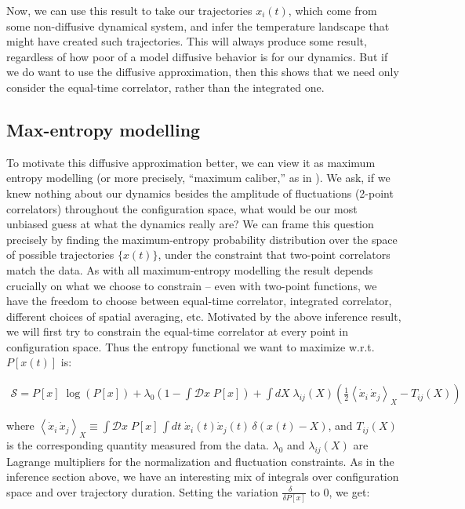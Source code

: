 \documentclass[reprint,prx]{revtex4-1}
\newcommand{\fd}[2]{\frac{\delta #1}{\delta #2}} %
\renewcommand{\=}[1]{\stackrel{#1}{=}} %
\renewcommand{\(}{\left (}
\renewcommand{\)}{\right  )}
\renewcommand{\[}{\left [}
\renewcommand{\]}{\right ]}
\newcommand{\<}{\left <}
\renewcommand{\>}{\right >}
\theoremstyle{definition}
\theoremstyle{remark}
\begin{document}
Now, we can use this result to take our trajectories $ x_i(t) $, which come from some non-diffusive dynamical system, and infer the temperature landscape that might have created such trajectories. This will always produce some result, regardless of how poor of a model diffusive behavior is for our dynamics. But if we do want to use the diffusive approximation, then this shows that we need only consider the equal-time correlator, rather than the integrated one. 

\subsection{Max-entropy modelling}

To motivate this diffusive approximation better, we can view it as maximum entropy modelling (or more precisely, ``maximum caliber,'' as in \cite{dill18max_caliber}). We ask, if we knew nothing about our dynamics besides the amplitude of fluctuations (2-point correlators) throughout the configuration space, what would be our most unbiased guess at what the dynamics really are? We can frame this question precisely by finding the maximum-entropy probability distribution over the space of possible trajectories $ \{x(t)\} $, under the constraint that two-point correlators match the data. As with all maximum-entropy modelling the result depends crucially on what we choose to constrain -- even with two-point functions, we have the freedom to choose between equal-time correlator, integrated correlator, different choices of spatial averaging, etc. Motivated by the above inference result, we will first try to constrain the equal-time correlator at every point in configuration space. Thus the entropy functional we want to maximize w.r.t. $ P[x(t)] $ is:
\begin{widetext}
\begin{align*}
\mathcal{S} = P[x] \;\log\(P[x]\) + \lambda_0 \(1- \int \mathcal{D} x \;P[x]\) + 
\int dX \; \lambda_{ij}(X) \(\frac{1}{2}\< \dot{x}_i\,\dot{x}_j\> _X - T_{ij}(X)\)
\end{align*}
\end{widetext}
where $ \< \dot{x}_i\, \dot{x}_j\> _X \equiv \int \mathcal{D}x \; P[x] \,\int dt \; \dot{x}_i(t) \dot{x}_j(t) \,\delta(x(t) - X) $, and $ T_{ij}(X) $ is the corresponding quantity measured from the data. $ \lambda_0 $ and $ \lambda_{ij}(X) $ are Lagrange multipliers for the normalization and fluctuation constraints. As in the inference section above, we have an interesting mix of integrals over configuration space and over trajectory duration. Setting the variation $ \fd{\quad}{P[x]} $ to 0, we get:
\end{document}
